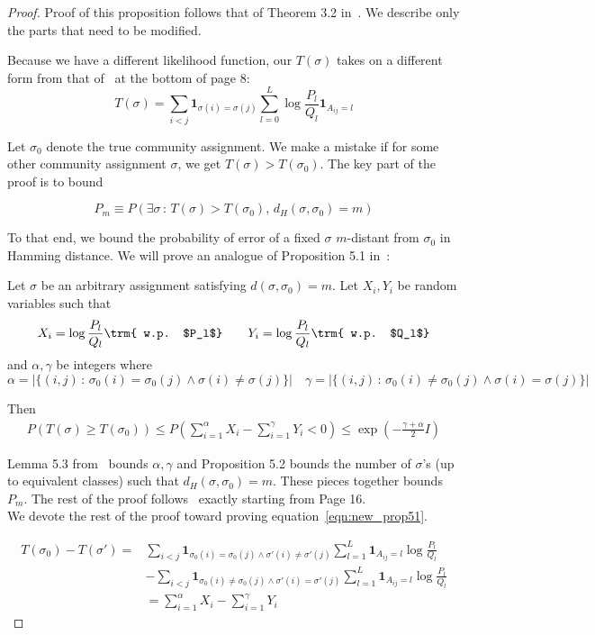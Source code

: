 \documentclass{article}
\begin{document}
\begin{proof}
Proof of this proposition follows that of Theorem 3.2 in~\cite{zhangminimax}. We describe only the parts that need to be modified. 

Because we have a different likelihood function, our $T(\sigma)$ takes on a different form from that of~\cite{zhangminimax} at the bottom of page 8:
\[
T(\sigma) = \sum_{i<j} \mathbf{1}_{\sigma(i) = \sigma(j)} \sum_{l=0}^L \log \frac{P_l}{Q_l} \mathbf{1}_{A_{ij} = l} 
\]

Let $\sigma_0$ denote the true community assignment. We make a mistake if for some other community assignment $\sigma$, we get $T(\sigma) > T(\sigma_0)$. The key part of the proof is to bound

$$
P_m \equiv P\left(\exists \sigma \,:\,  T(\sigma) > T(\sigma_0),\, d_H(\sigma, \sigma_0) = m \right)
$$

To that end, we bound the probability of error of a fixed $\sigma$ $m$-distant from $\sigma_0$ in Hamming distance. We will prove an analogue of Proposition 5.1 in~\cite{zhangminimax}:

Let $\sigma$ be an arbitrary assignment satisfying $d(\sigma, \sigma_0) = m$. Let $X_i, Y_i$ be random variables such that
\[
X_i = \log \frac{P_l}{Q_l} \trm{ w.p. $P_l$} \qquad 
Y_i = \log \frac{P_l}{Q_l} \trm{ w.p. $Q_l$} 
\]
and $\alpha, \gamma$ be integers where
\[
\alpha = | \{ (i,j) \,:\, \sigma_0(i) = \sigma_0(j) \wedge \sigma(i) \neq \sigma(j) \} | 
\quad
\gamma = | \{ (i,j) \,:\, \sigma_0(i) \neq \sigma_0(j) \wedge \sigma(i) = \sigma(j) \} | 
\]

Then
\begin{align}
P( T(\sigma) \geq T(\sigma_0) ) \leq 
  P\left( \sum_{i=1}^\alpha X_i - \sum_{i=1}^\gamma Y_i < 0 \right) \leq 
  \exp( - \frac{\gamma + \alpha}{2} I) \label{eqn:new_prop51}
\end{align}

Lemma 5.3 from~\cite{zhangminimax} bounds $\alpha, \gamma$ and Proposition 5.2 bounds the number of $\sigma$'s (up to equivalent classes) such that $d_H(\sigma, \sigma_0) = m$. These pieces together bounds $P_m$. The rest of the proof follows~\cite{zhangminimax} exactly starting from Page 16. \\

We devote the rest of the proof toward proving equation~\ref{eqn:new_prop51}.

\begin{align*}
T(\sigma_0) - T(\sigma') = &
   \sum_{i<j} \mathbf{1}_{\sigma_0(i) = \sigma_0(j) \wedge \sigma'(i) \neq \sigma'(j)} \sum_{l=1}^L \mathbf{1}_{A_{ij} = l} \log \frac{P_l}{Q_l} \\
    &- \sum_{i<j} \mathbf{1}_{\sigma_0(i) \neq \sigma_0(j) \wedge \sigma'(i) = \sigma'(j)} \sum_{l=1}^L \mathbf{1}_{A_{ij} = l} \log \frac{P_l}{Q_l} \\
 &=  \sum_{i=1}^\alpha X_i - \sum_{i=1}^\gamma Y_i 
\end{align*}



\end{proof}
\end{document}
